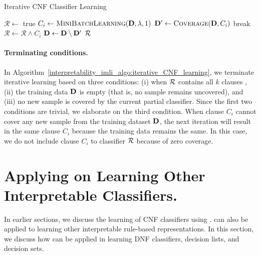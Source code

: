 \begin{algorithm}
	\caption{Iterative CNF Classifier Learning}
	\label{interpretability_imli_algo:iterative_CNF_learning}
	\begin{algorithmic}[1]
		\State $ \mathcal{R} \leftarrow $ true 
		\State $ C_i \leftarrow \textsc{MiniBatchLearning}( \mathbf{D},\lambda, 1) $ 
		\label{interpretability_imli_algo:iterative_CNF_learning_incremental_learning}
		\State $ \mathbf{D}' \leftarrow \textsc{Coverage}(\mathbf{D}, C_i) $
		\label{interpretability_imli_algo:iterative_CNF_learning_coverage}
		 
		\State break
		\EndIf
		\State $ \mathcal{R} \leftarrow \mathcal{R}  \wedge C_i $
		\State $ \mathbf{D}  \leftarrow \mathbf{D}  \setminus \mathbf{D}' $ 
		\EndFor
		\State \Return $ {\mathcal{R}} $
		\EndProcedure
	\end{algorithmic}
\end{algorithm}

\paragraph{Terminating conditions.} In Algorithm~\ref{interpretability_imli_algo:iterative_CNF_learning}, we terminate iterative learning based on three conditions: (i) when $ {\mathcal{R}} $ contains all $ k $ clauses , (ii) the training data $ \mathbf{D} $ is empty (that is, no sample remains uncovered), and (iii) no new sample is covered by the current partial classifier. Since the first two conditions are trivial, we elaborate on the third condition. When clause $ C_i $ cannot cover any new sample from the training dataset $ \mathbf{D} $, the next iteration will result in the same clause $ C_i $ because the training data remains the same. In this case, we do not include clause $ C_i $ to classifier $ {\mathcal{R}} $ because of zero coverage. 




\section{Applying {\imli} on Learning Other Interpretable Classifiers.}
\label{interpretability_imli_sec:application}
In earlier sections, we discuss the learning of CNF classifiers using  {\imli}. {\imli} can also be applied to learning other interpretable rule-based representations. In this section, we discuss how {\imli} can be applied in learning DNF classifiers, decision lists, and decision sets.

